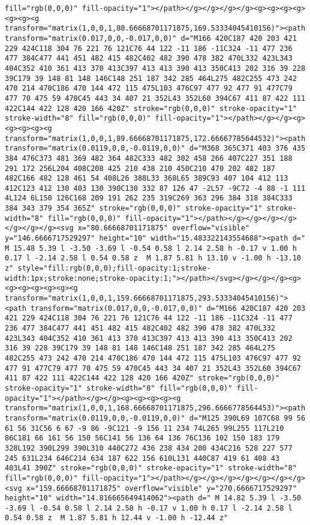 \documentclass[
]{article}
\begin{document}
\begin{verbatim}
fill="rgb(0,0,0)" fill-opacity="1"></path></g></g></g></g><g><g><g><g><g><g><g transform="matrix(1,0,0,1,80.66668701171875,169.53334045410156)"><path transform="matrix(0.017,0,0,-0.017,0,0)" d="M166 420C187 420 203 421 229 424C118 304 76 221 76 121C76 44 122 -11 186 -11C324 -11 477 236 477 384C477 441 451 482 415 482C402 482 390 478 382 470L332 423L343 404C352 410 361 413 370 413C397 413 413 390 413 350C413 202 316 39 228 39C179 39 148 81 148 146C148 251 187 342 285 464L275 482C255 473 242 470 214 470C186 470 144 472 115 475L103 476C97 477 92 477 91 477C79 477 70 475 59 470C45 443 34 407 21 352L43 352L60 394C67 411 87 422 111 422C144 422 128 420 166 420Z" stroke="rgb(0,0,0)" stroke-opacity="1" stroke-width="8" fill="rgb(0,0,0)" fill-opacity="1"></path></g></g><g><g><g><g><g transform="matrix(1,0,0,1,89.66668701171875,172.66667785644532)"><path transform="matrix(0.0119,0,0,-0.0119,0,0)" d="M368 365C371 403 376 435 384 476C373 481 369 482 364 482C333 482 302 458 266 407C227 351 188 291 172 256L204 408C208 425 210 438 210 450C210 470 202 482 187 482C166 482 128 461 54 408L26 388L33 368L65 389C93 407 104 412 113 412C123 412 130 403 130 390C130 332 87 126 47 -2L57 -9C72 -4 88 -1 111 4L124 6L150 126C168 209 191 262 235 319C269 363 296 384 318 384C333 384 343 379 354 365Z" stroke="rgb(0,0,0)" stroke-opacity="1" stroke-width="8" fill="rgb(0,0,0)" fill-opacity="1"></path></g></g></g></g></g></g></g><svg x="80.66668701171875" overflow="visible" y="146.6666717529297" height="10" width="15.483322143554688"><path d=" M 15.48 5.39 l -3.50 -3.69 l -0.54 0.58 l 2.14 2.58 h -0.17 v 1.00 h 0.17 l -2.14 2.58 l 0.54 0.58 z  M 1.87 5.81 h 13.10 v -1.00 h -13.10 z" style="fill:rgb(0,0,0);fill-opacity:1;stroke-width:1px;stroke:none;stroke-opacity:1;"></path></svg></g></g></g><g><g><g><g><g><g><g transform="matrix(1,0,0,1,159.66668701171875,293.53334045410156)"><path transform="matrix(0.017,0,0,-0.017,0,0)" d="M166 420C187 420 203 421 229 424C118 304 76 221 76 121C76 44 122 -11 186 -11C324 -11 477 236 477 384C477 441 451 482 415 482C402 482 390 478 382 470L332 423L343 404C352 410 361 413 370 413C397 413 413 390 413 350C413 202 316 39 228 39C179 39 148 81 148 146C148 251 187 342 285 464L275 482C255 473 242 470 214 470C186 470 144 472 115 475L103 476C97 477 92 477 91 477C79 477 70 475 59 470C45 443 34 407 21 352L43 352L60 394C67 411 87 422 111 422C144 422 128 420 166 420Z" stroke="rgb(0,0,0)" stroke-opacity="1" stroke-width="8" fill="rgb(0,0,0)" fill-opacity="1"></path></g></g><g><g><g><g><g transform="matrix(1,0,0,1,168.66668701171875,296.6666778564453)"><path transform="matrix(0.0119,0,0,-0.0119,0,0)" d="M125 390L69 107C68 99 56 61 56 31C56 6 67 -9 86 -9C121 -9 156 11 234 74L265 99L255 117L210 86C181 66 161 56 150 56C141 56 136 64 136 76C136 102 150 183 179 328L192 390L299 390L310 440C272 436 238 434 200 434C216 528 227 577 245 631L234 646C214 634 187 622 156 610L131 440C87 419 61 408 43 403L41 390Z" stroke="rgb(0,0,0)" stroke-opacity="1" stroke-width="8" fill="rgb(0,0,0)" fill-opacity="1"></path></g></g></g></g></g></g></g><svg x="159.66668701171875" overflow="visible" y="270.6666717529297" height="10" width="14.816665649414062"><path d=" M 14.82 5.39 l -3.50 -3.69 l -0.54 0.58 l 2.14 2.58 h -0.17 v 1.00 h 0.17 l -2.14 2.58 l 0.54 0.58 z  M 1.87 5.81 h 12.44 v -1.00 h -12.44 z" 
\end{verbatim}
\end{document}
